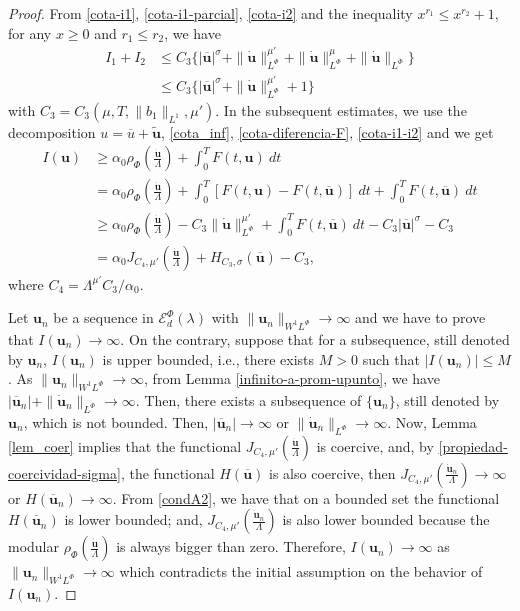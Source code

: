 \documentclass[twoside]{article}
\theoremstyle{remark}
\newcommand{\orlnor}{\|_{L^{\Phi}}}
\newcommand{\lphi}{L^{\Phi}}
\newcommand{\sobnor}{\|_{W^{1}\lphi}}
\newcommand{\domi}{\mathcal{E}^{\Phi}_d(\lambda)}
\renewcommand{\b}[1]{\boldsymbol{#1}}
\renewcommand{\leq}{\leqslant}
\renewcommand{\geq}{\geqslant}
\begin{document}
\begin{proof}
From \eqref{cota-i1}, \eqref{cota-i1-parcial}, \eqref{cota-i2} and the inequality $x^{r_1}\leq x^{r_2}+1$, for any $x\geq 0$ and $r_1\leq r_2$, we have
\begin{equation}\label{cota-i1-i2}
\begin{split}
I_1+I_2
&\leq C_3\bigg\{ |\b{\overline{u}}|^{\sigma}
+ \|\b{\dot u}\orlnor^{\mu'}
+ \|\b{\dot u}\orlnor^{\mu}
+\|\b{\dot u}\orlnor\bigg\}\\
&\leq C_3\bigg\{ |\b{\overline{u}}|^{\sigma}
+ \|\b{\dot u}\orlnor^{\mu'}
+1\bigg\}
\end{split}
\end{equation}
with $C_3= C_3(\mu,T, \|b_1\|_{L^1},\mu' )$. In the subsequent estimates, we use the decomposition $u=\overline{u}+\b{\tilde{u}}$, \eqref{cota_inf}, \eqref{cota-diferencia-F},
\eqref{cota-i1-i2} and we get
\begin{equation}\label{cota_inf_I}
\begin{split}
I(\b{u})&\geq\alpha_0\rho_{\Phi}\left( \frac{\b{\dot{u}}}{\Lambda}\right)+\int_0^TF(t,\b{u})\ dt
\\ 
&=\alpha_0\rho_{\Phi}\left( \frac{\b{\dot{u}}}{\Lambda}\right)+ \int_0^T \left[F(t,\b{u})-F(t,\b{\overline{u}})\right]\ dt 
+  \int_0^TF(t,\b{\overline{u}})\ dt
\\
&\geq \alpha_0\rho_{\Phi}\left( \frac{\b{\dot{u}}}{\Lambda}\right)
-C_3 \|\b{\dot u}\orlnor^{\mu'}
+\int_0^TF(t,\b{\overline{u}})\ dt-
C_3 |\b{\overline{u}}|^{\sigma}-C_3\\
&=\alpha_0J_{C_4,\mu'}\left(\frac{\b{\dot u}}{\Lambda}\right)
+ H_{C_3,\sigma}(\b{\overline{u}})-C_3,
\end{split}
\end{equation}
where $C_4=\Lambda^{\mu'}C_3/\alpha_0$.


Let $\b{u}_n$ be  a sequence in $\domi$ with 
$\|\b{u}_n\sobnor\to\infty$ and we have to prove that $I(\b{u}_n)\to\infty$. 
On the contrary, suppose  that for a subsequence, 
still denoted by $\b{u}_n$, $I(\b{u}_n)$ is upper bounded, i.e., there exists $M>0$ such that $|I(\b{u}_{n})|\leq M$. 
As $\|\b{u}_n\sobnor\to\infty$, from Lemma \ref{infinito-a-prom-upunto},  we have $|\overline{\b{u}}_n|+\|\b{\dot{u}}_n\orlnor\to \infty$.
Then, there exists a subsequence of $\{\b{u}_n\}$, still denoted by $\b{u}_n$, which is not bounded.
Then, 
$|\b{\overline u}_n|\to \infty$ or $\|\b{\dot{u}}_n\orlnor\to \infty$.
Now, Lemma \ref{lem_coer} implies that the functional $J_{C_4,\mu'}(\frac{\b{\dot u}}{\Lambda})$ is coercive,
and, by \eqref{propiedad-coercividad-sigma},
the functional $H(\b{\overline{u}})$ is also coercive, then 
$J_{C_4,\mu'}(\frac{\b{\dot u}_n}{\Lambda}) \to \infty$ or $H(\b{\overline{u}}_n)\to \infty$.
From \eqref{condA2}, we have that on a bounded set the functional $H(\b{\overline{u}}_n)$ is lower bounded; and, $J_{C_4,\mu'}(\frac{\b{\dot u}_n}{\Lambda})$ is also lower bounded  because the modular $\rho_{\Phi}\left(\frac{\b{\dot u}}{\Lambda}\right)$ is always bigger than zero. 
Therefore,  $I(\b{u}_n)\to\infty$ as $\|\b{u}_n\sobnor\to\infty$ which contradicts the initial assumption on the behavior of $I(\b{u}_n)$. 
\end{proof}
\end{document}
